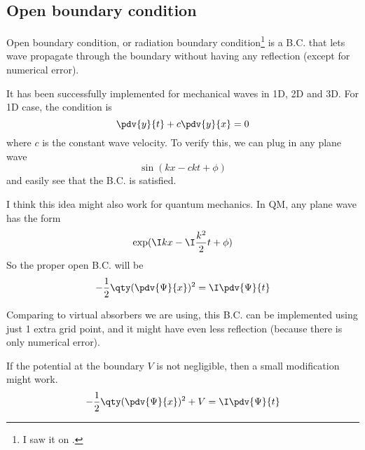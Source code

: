 
\subsection{Open boundary condition}

Open boundary condition, or radiation boundary condition\footnote{I saw it on .} is a B.C. that lets wave propagate through the boundary without having any reflection (except for numerical error).

It has been successfully implemented for mechanical waves in 1D, 2D and 3D. For 1D case, the condition is
\begin{equation}
\pdv{y}{t} + c\pdv{y}{x} = 0
\end{equation}
where $c$ is the constant wave velocity. To verify this, we can plug in any plane wave
\begin{equation}
\sin(kx - ckt + \phi)
\end{equation}
and easily see that the B.C. is satisfied.

I think this idea might also work for quantum mechanics. In QM, any plane wave has the form
\begin{equation}
\exp(\I kx - \I \frac{k^2}{2}t + \phi)
\end{equation}
So the proper open B.C. will be
\begin{equation}
-\frac12 \qty(\pdv{\Psi}{x})^2 = \I \pdv{\Psi}{t}
\end{equation}

Comparing to virtual absorbers we are using, this B.C. can be implemented using just 1 extra grid point, and it might have even less reflection (because there is only numerical error).

If the potential at the boundary $V$ is not negligible, then a small modification might work.
\begin{equation}
-\frac12 \qty(\pdv{\Psi}{x})^2 + V = \I \pdv{\Psi}{t}
\end{equation}
